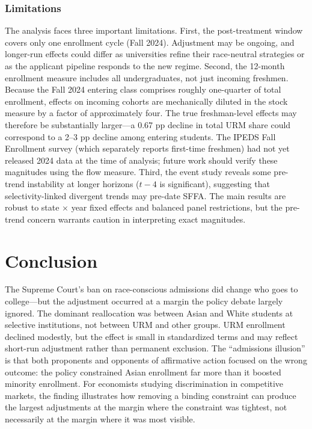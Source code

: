 \documentclass[12pt]{article}
\begin{document}
\subsubsection*{Limitations} The analysis faces three important limitations. First, the post-treatment window covers only one enrollment cycle (Fall 2024). Adjustment may be ongoing, and longer-run effects could differ as universities refine their race-neutral strategies or as the applicant pipeline responds to the new regime. Second, the 12-month enrollment measure includes all undergraduates, not just incoming freshmen. Because the Fall 2024 entering class comprises roughly one-quarter of total enrollment, effects on incoming cohorts are mechanically diluted in the stock measure by a factor of approximately four. The true freshman-level effects may therefore be substantially larger---a 0.67 pp decline in total URM share could correspond to a 2--3 pp decline among entering students. The IPEDS Fall Enrollment survey (which separately reports first-time freshmen) had not yet released 2024 data at the time of analysis; future work should verify these magnitudes using the flow measure. Third, the event study reveals some pre-trend instability at longer horizons ($t-4$ is significant), suggesting that selectivity-linked divergent trends may pre-date SFFA. The main results are robust to state $\times$ year fixed effects and balanced panel restrictions, but the pre-trend concern warrants caution in interpreting exact magnitudes.

\section{Conclusion}

The Supreme Court's ban on race-conscious admissions did change who goes to college---but the adjustment occurred at a margin the policy debate largely ignored. The dominant reallocation was between Asian and White students at selective institutions, not between URM and other groups. URM enrollment declined modestly, but the effect is small in standardized terms and may reflect short-run adjustment rather than permanent exclusion. The ``admissions illusion'' is that both proponents and opponents of affirmative action focused on the wrong outcome: the policy constrained Asian enrollment far more than it boosted minority enrollment. For economists studying discrimination in competitive markets, the finding illustrates how removing a binding constraint can produce the largest adjustments at the margin where the constraint was tightest, not necessarily at the margin where it was most visible.
\end{document}
